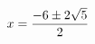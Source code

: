 \documentclass[preview]{standalone}
\begin{document}
\begin{align*}
\special{dvisvgm:raw <g id='unique000'>}x=\frac{-6\pm 2 \sqrt{5}}{2}\special{dvisvgm:raw </g>}
\end{align*}
\end{document}
